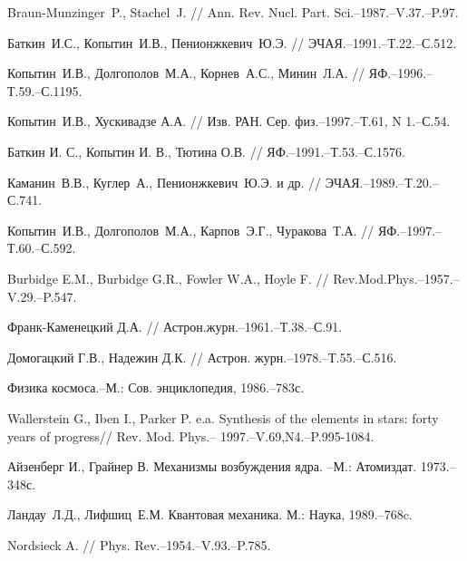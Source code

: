 \pagebreak

\begin{thebibliography}{200}


Braun-Munzinger~P., Stachel~J. // Ann. Rev. Nucl. Part. Sci.--1987.--V.37.--P.97.

Баткин~И.С., Копытин~И.В., Пенионжкевич~Ю.Э. // ЭЧАЯ.--1991.--Т.22.--С.512.


Копытин~И.В., Долгополов~М.А., Корнев~А.С., Минин~Л.А.
// ЯФ.--1996.--Т.59.--С.1195.


Копытин~И.В., Хускивадзе А.А.
// Изв. РАН. Сер. физ.--1997.--Т.61, N 1.--С.54.

Баткин И. С., Копытин И. В., Тютина О.В. // ЯФ.--1991.--Т.53.--С.1576.

Каманин~В.В., Куглер~А., Пенионжкевич~Ю.Э. и др. // ЭЧАЯ.--1989.--Т.20.--С.741.



Копытин~И.В., Долгополов~М.А., Карпов~Э.Г., Чуракова~Т.А.
// ЯФ.--1997.--Т.60.--С.592.

Burbidge E.M., Burbidge G.R., Fowler W.A., Hoyle F. // Rev.Mod.Phys.--1957.--
V.29.--P.547.

Франк-Каменецкий Д.А. // Астрон.журн.--1961.--Т.38.--С.91.

Домогацкий Г.В., Надежин Д.К. // Астрон. журн.--1978.--Т.55.--С.516.


Физика космоса.--М.: Сов. энциклопедия, 1986.--783с.

Wallerstein G., Iben I., Parker P. e.a. Synthesis of the elements in
stars: forty years of progress// Rev. Mod. Phys.-- 1997.--V.69,N4.--P.995-1084.

Айзенберг И., Грайнер В. Механизмы возбуждения ядра. --М.: Атомиздат. 1973.--348с.

Ландау~Л.Д., Лифшиц~Е.М. Квантовая механика. М.: Наука, 1989.--768c.

Nordsieck A. // Phys. Rev.--1954.--V.93.--P.785.


\end{thebibliography}
